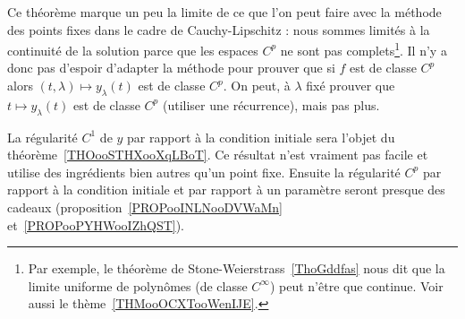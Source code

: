 \begin{normaltext}
    Ce théorème marque un peu la limite de ce que l'on peut faire avec la méthode des points fixes dans le cadre de Cauchy-Lipschitz : nous sommes limités à la continuité de la solution parce que les espaces \( C^p\) ne sont pas complets\footnote{Par exemple, le théorème de Stone-Weierstrass~\ref{ThoGddfas} nous dit que la limite uniforme de polynômes (de classe \(  C^{\infty}\)) peut n'être que continue. Voir aussi le thème~\ref{THMooOCXTooWenIJE}.}. Il n'y a donc pas d'espoir d'adapter la méthode pour prouver que si \( f\) est de classe \( C^p\) alors \( (t,\lambda)\mapsto y_{\lambda}(t)\) est de classe \( C^p\). On peut, à \( \lambda\) fixé prouver que \( t\mapsto y_{\lambda}(t)\) est de classe \( C^p\) (utiliser une récurrence), mais pas plus.

    La régularité \( C^1\) de \( y\) par rapport à la condition initiale sera l'objet du théorème~\ref{THOooSTHXooXqLBoT}. Ce résultat n'est vraiment pas facile et utilise des ingrédients bien autres qu'un point fixe. Ensuite la régularité \( C^p\) par rapport à la condition initiale et par rapport à un paramètre seront presque des cadeaux (proposition~\ref{PROPooINLNooDVWaMn} et~\ref{PROPooPYHWooIZhQST}).
\end{normaltext}

